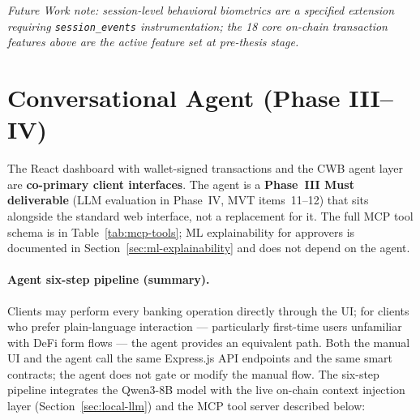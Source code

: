 \documentclass[12pt,a4paper]{report}
\begin{document}
\noindent\textit{Future Work note: session-level behavioral biometrics are a specified extension requiring \texttt{session\_events} instrumentation; the 18 core on-chain transaction features above are the active feature set at pre-thesis stage.}

\section{Conversational Agent (Phase III--IV)}
\label{sec:optional-agent}

The React dashboard with wallet-signed transactions and the CWB agent layer are \textbf{co-primary client interfaces}. The agent is a \textbf{Phase~III Must deliverable} (LLM evaluation in Phase~IV, MVT items~11--12) that sits alongside the standard web interface, not a replacement for it. The full MCP tool schema is in Table~\ref{tab:mcp-tools}; ML explainability for approvers is documented in Section~\ref{sec:ml-explainability} and does not depend on the agent.

\paragraph{Agent six-step pipeline (summary).} Clients may perform every banking operation directly through the UI; for clients who prefer plain-language interaction --- particularly first-time users unfamiliar with DeFi form flows --- the agent provides an equivalent path. Both the manual UI and the agent call the same Express.js API endpoints and the same smart contracts; the agent does not gate or modify the manual flow. The six-step pipeline integrates the Qwen3-8B model with the live on-chain context injection layer (Section~\ref{sec:local-llm}) and the MCP tool server described below:
\end{document}
